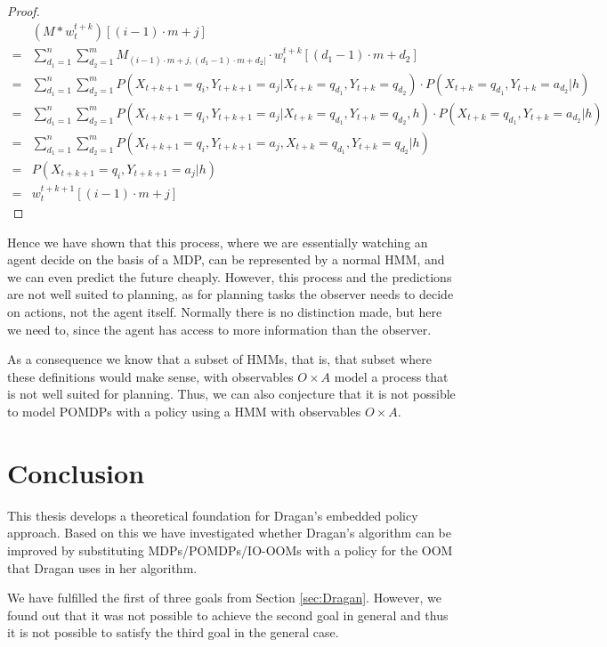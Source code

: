 \documentclass{article}
\theoremstyle{definition}
\begin{document}
\begin{proof}
\begin{align*}
&(M*w_{t}^{t+k})[(i-1)\cdot m+j]\\
=&\sum\limits_{d_1=1}^n \sum\limits_{d_2=1}^m M_{(i-1)\cdot m+j,(d_1-1)\cdot m+d_2|} \cdot w_t^{t+k}[(d_1-1)\cdot m+d_2]  \\
=&\sum\limits_{d_1=1}^n \sum\limits_{d_2=1}^m P(X_{t+k+1}=q_i,Y_{t+k+1}=a_j|X_{t+k}=q_{d_1},Y_{t+k}=q_{d_2})\cdot P(X_{t+k}=q_{d_1},Y_{t+k}=a_{d_2}|h) \\
=&\sum\limits_{d_1=1}^n \sum\limits_{d_2=1}^m P(X_{t+k+1}=q_i,Y_{t+k+1}=a_j|X_{t+k}=q_{d_1},Y_{t+k}=q_{d_2},h)\cdot P(X_{t+k}=q_{d_1},Y_{t+k}=a_{d_2}|h) \\
=&\sum\limits_{d_1=1}^n \sum\limits_{d_2=1}^m P(X_{t+k+1}=q_i,Y_{t+k+1}=a_j,X_{t+k}=q_{d_1},Y_{t+k}=q_{d_2}|h) \\
=&P(X_{t+k+1}=q_i,Y_{t+k+1}=a_j|h) \\
=&w_t^{t+k+1}[(i-1)\cdot m+j]
\end{align*}
\end{proof}
Hence we have shown that this process, where we are essentially watching an agent decide on the basis of a MDP, can be represented by a normal HMM, and we can even predict the future cheaply. However, this process and the predictions are not well suited to planning, as for planning tasks the observer needs to decide on actions, not the agent itself. Normally there is no distinction made, but here we need to, since the agent has access to more information than the observer. 

As a consequence we know that a subset of HMMs, that is, that subset where these definitions would make sense, with observables $O\times A$ model a process that is not well suited for planning. Thus, we can also conjecture that it is not possible to model POMDPs with a policy using  a HMM with observables $O\times A$.
\section{Conclusion}\label{sec:conc}
This thesis develops a theoretical foundation for Dragan's embedded policy approach. Based on this we have investigated whether Dragan's algorithm can be improved by substituting MDPs/POM\-DPs/IO-OOMs with a policy for the OOM that Dragan uses in her algorithm. 

We have fulfilled the first of three goals from Section \ref{sec:Dragan}. However, we found out that it was not possible to achieve the second goal in general and thus it is not possible to satisfy the third goal in the general case. 
\end{document}
